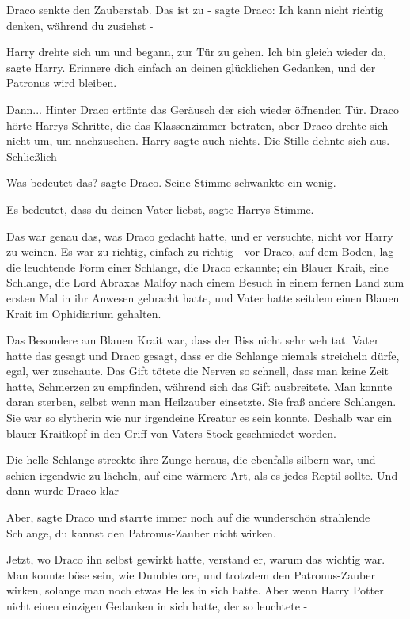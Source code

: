 Draco senkte den Zauberstab. \glqq Das ist zu -\grqq{} sagte Draco: \glqq Ich
kann nicht richtig denken, während du zusiehst -\grqq{}

Harry drehte sich um und begann, zur Tür zu gehen. \glqq Ich bin gleich wieder
da\grqq{}, sagte Harry. \glqq Erinnere dich einfach an deinen glücklichen
Gedanken, und der Patronus wird bleiben.\grqq{}

Dann... Hinter Draco ertönte das Geräusch der sich wieder öffnenden Tür. Draco
hörte Harrys Schritte, die das Klassenzimmer betraten, aber Draco drehte sich
nicht um, um nachzusehen. Harry sagte auch nichts. Die Stille dehnte sich aus.
Schließlich -

\glqq Was bedeutet das?\grqq{} sagte Draco. Seine Stimme schwankte ein wenig.

\glqq Es bedeutet, dass du deinen Vater liebst\grqq{}, sagte Harrys Stimme.

Das war genau das, was Draco gedacht hatte, und er versuchte, nicht vor Harry zu
weinen. Es war zu richtig, einfach zu richtig - vor Draco, auf dem Boden, lag
die leuchtende Form einer Schlange, die Draco erkannte; ein Blauer Krait, eine
Schlange, die Lord Abraxas Malfoy nach einem Besuch in einem fernen Land zum
ersten Mal in ihr Anwesen gebracht hatte, und Vater hatte seitdem einen Blauen
Krait im Ophidiarium gehalten.

Das Besondere am Blauen Krait war, dass der Biss nicht sehr weh tat. Vater hatte
das gesagt und Draco gesagt, dass er die Schlange niemals streicheln dürfe,
egal, wer zuschaute. Das Gift tötete die Nerven so schnell, dass man keine Zeit
hatte, Schmerzen zu empfinden, während sich das Gift ausbreitete. Man konnte
daran sterben, selbst wenn man Heilzauber einsetzte. Sie fraß andere Schlangen.
Sie war so slytherin wie nur irgendeine Kreatur es sein konnte. Deshalb war ein
blauer Kraitkopf in den Griff von Vaters Stock geschmiedet worden.

Die helle Schlange streckte ihre Zunge heraus, die ebenfalls silbern war, und
schien irgendwie zu lächeln, auf eine wärmere Art, als es jedes Reptil sollte.
Und dann wurde Draco klar -

\glqq Aber\grqq{}, sagte Draco und starrte immer noch auf die wunderschön
strahlende Schlange, \glqq du kannst den Patronus-Zauber nicht wirken.\grqq{}

Jetzt, wo Draco ihn selbst gewirkt hatte, verstand er, warum das wichtig war.
Man konnte böse sein, wie Dumbledore, und trotzdem den Patronus-Zauber wirken,
solange man noch etwas Helles in sich hatte. Aber wenn Harry Potter nicht einen
einzigen Gedanken in sich hatte, der so leuchtete -

